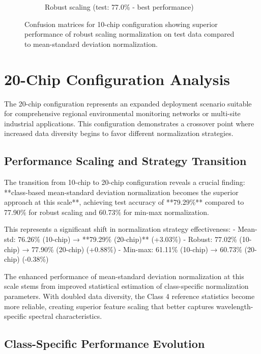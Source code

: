 \begin{figure}[H]
\begin{subfigure}[b]{0.45\textwidth}
  \caption{Robust scaling (test: 77.0\% - best performance)}
  \label{fig:confusion_matrix_test_10}
\end{subfigure}
\caption{Confusion matrices for 10-chip configuration showing superior performance of robust scaling normalization on test data compared to mean-standard deviation normalization.}
\label{fig:confusion_matrices_10chip}
\end{figure}

\section{20-Chip Configuration Analysis}
\label{sec:20chip_analysis}

The 20-chip configuration represents an expanded deployment scenario suitable for comprehensive regional environmental monitoring networks or multi-site industrial applications. This configuration demonstrates a crossover point where increased data diversity begins to favor different normalization strategies.

\subsection{Performance Scaling and Strategy Transition}

The transition from 10-chip to 20-chip configuration reveals a crucial finding: **class-based mean-standard deviation normalization becomes the superior approach at this scale**, achieving test accuracy of **79.29\%** compared to 77.90\% for robust scaling and 60.73\% for min-max normalization.

This represents a significant shift in normalization strategy effectiveness:
- Mean-std: 76.26\% (10-chip) → **79.29\% (20-chip)** (+3.03\%)
- Robust: 77.02\% (10-chip) → 77.90\% (20-chip) (+0.88\%)
- Min-max: 61.11\% (10-chip) → 60.73\% (20-chip) (-0.38\%)

The enhanced performance of mean-standard deviation normalization at this scale stems from improved statistical estimation of class-specific normalization parameters. With doubled data diversity, the Class 4 reference statistics become more reliable, creating superior feature scaling that better captures wavelength-specific spectral characteristics.

\subsection{Class-Specific Performance Evolution}

